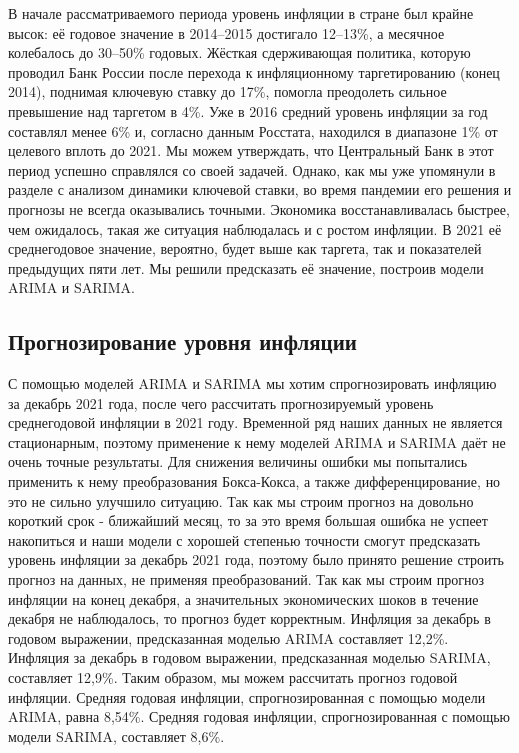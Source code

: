 \noindent
В начале рассматриваемого периода уровень инфляции в стране был крайне высок: её годовое значение в 2014–2015 достигало 12–13\%, а месячное колебалось до 30–50\% годовых. Жёсткая сдерживающая политика, которую проводил Банк России после перехода к инфляционному таргетированию (конец 2014), поднимая ключевую ставку до 17\%, помогла преодолеть сильное превышение над таргетом в 4\%. Уже в 2016 средний уровень инфляции за год составлял менее 6\% и, согласно данным Росстата, находился в диапазоне 1\% от целевого вплоть до 2021. Мы можем утверждать, что Центральный Банк в этот период успешно справлялся со своей задачей. Однако, как мы уже упомянули в разделе с анализом динамики ключевой ставки, во время пандемии его решения и прогнозы не всегда оказывались точными. Экономика восстанавливалась быстрее, чем ожидалось, такая же ситуация наблюдалась и с ростом инфляции. В 2021 её среднегодовое значение, вероятно, будет выше как таргета, так и показателей предыдущих пяти лет. Мы решили предсказать её значение, построив модели ARIMA и SARIMA. \newline

\subsection{Прогнозирование уровня инфляции}
\noindent
С помощью моделей ARIMA и SARIMA мы хотим спрогнозировать инфляцию за декабрь 2021 года, после чего рассчитать прогнозируемый уровень среднегодовой инфляции в 2021 году. Временной ряд наших данных не является стационарным, поэтому применение к нему моделей ARIMA и SARIMA даёт не очень точные результаты. Для снижения величины ошибки мы попытались применить к нему преобразования Бокса-Кокса, а также дифференцирование, но это не сильно улучшило ситуацию. Так как мы строим прогноз на довольно короткий срок - ближайший месяц, то за это время большая ошибка не успеет накопиться и наши модели с хорошей степенью точности смогут предсказать уровень инфляции за декабрь 2021 года, поэтому было принято решение строить прогноз на данных, не применяя преобразований. Так как мы строим прогноз инфляции на конец декабря, а значительных экономических шоков в течение декабря не наблюдалось, то прогноз будет корректным. Инфляция за декабрь в годовом выражении, предсказанная моделью ARIMA составляет 12,2\%. Инфляция за декабрь в годовом выражении, предсказанная моделью SARIMA, составляет 12,9\%. \newpage
\noindent
Таким образом, мы можем рассчитать прогноз годовой инфляции. Средняя годовая инфляции, спрогнозированная с помощью модели ARIMA, равна 8,54\%. Средняя годовая инфляции, спрогнозированная с помощью модели SARIMA, составляет 8,6\%.









